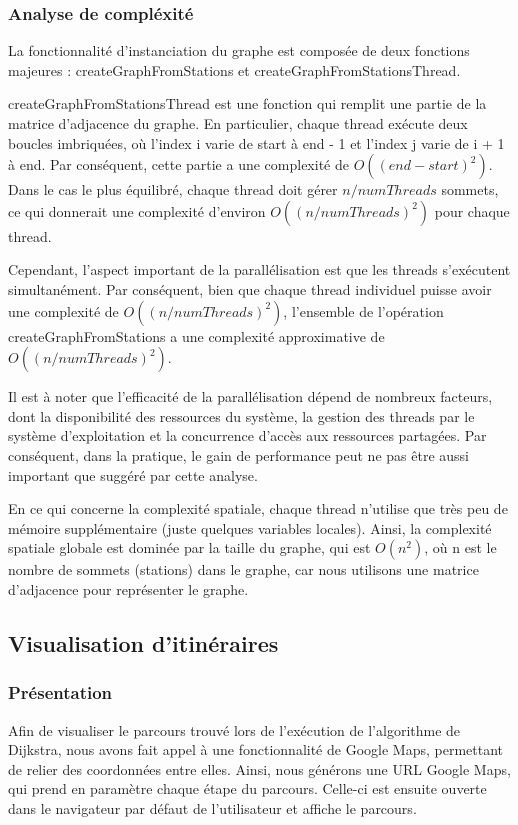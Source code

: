 \documentclass[french,a4paper]{article}
\begin{document}
\subsubsection{Analyse de compléxité}
La fonctionnalité d'instanciation du graphe est composée de deux fonctions majeures : createGraphFromStations et createGraphFromStationsThread.

createGraphFromStationsThread est une fonction qui remplit une partie de la matrice d'adjacence du graphe. En particulier, chaque thread exécute deux boucles imbriquées, où l'index i varie de start à end - 1 et l'index j varie de i + 1 à end. Par conséquent, cette partie a une complexité de $O((end-start)^2)$. Dans le cas le plus équilibré, chaque thread doit gérer $n / numThreads$ sommets, ce qui donnerait une complexité d'environ $O((n / numThreads)^2)$ pour chaque thread.

Cependant, l'aspect important de la parallélisation est que les threads s'exécutent simultanément. Par conséquent, bien que chaque thread individuel puisse avoir une complexité de $O((n / numThreads)^2)$, l'ensemble de l'opération createGraphFromStations a une complexité approximative de $O((n / numThreads)^2)$.

Il est à noter que l'efficacité de la parallélisation dépend de nombreux facteurs, dont la disponibilité des ressources du système, la gestion des threads par le système d'exploitation et la concurrence d'accès aux ressources partagées. Par conséquent, dans la pratique, le gain de performance peut ne pas être aussi important que suggéré par cette analyse.

En ce qui concerne la complexité spatiale, chaque thread n'utilise que très peu de mémoire supplémentaire (juste quelques variables locales). Ainsi, la complexité spatiale globale est dominée par la taille du graphe, qui est $O(n^2)$, où n est le nombre de sommets (stations) dans le graphe, car nous utilisons une matrice d'adjacence pour représenter le graphe.

\subsection{Visualisation d'itinéraires}

\subsubsection{Présentation}

Afin de visualiser le parcours trouvé lors de l'exécution de l'algorithme de Dijkstra, nous avons fait appel à une fonctionnalité de Google Maps, permettant de relier des coordonnées entre elles. Ainsi, nous générons une URL Google Maps, qui prend en paramètre chaque étape du parcours. Celle-ci est ensuite ouverte dans le navigateur par défaut de l'utilisateur et affiche le parcours.
\end{document}

